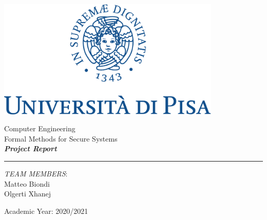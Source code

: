 \documentclass[12pt]{article}
\begin{document}
	
	
	\begin{titlepage}
		\begin{center}
			
			\begin{center}
				\includegraphics[width=0.8\textwidth]{img/marchio_unipi_pant541-eps-converted-to.pdf}         
			\end{center}
			{\Large
				\vspace{15mm}
				Computer Engineering\\
				\vspace{5mm}
				Formal Methods for Secure Systems}\\
			\vspace{30mm} 
			{\Huge\textbf{\textit{Project Report}}}\\
			\vspace{70mm} 
			\par\noindent\rule{\textwidth}{0.4pt}
			\begin{flushright}
				\textit{TEAM MEMBERS}:\\
				Matteo Biondi\\
				Olgerti Xhanej\\
				
				
			\end{flushright}
			\vfill
			Academic Year: 2020/2021\\        
		\end{center}
	\end{titlepage} 
	\tableofcontents
	
	
	
\end{document}

